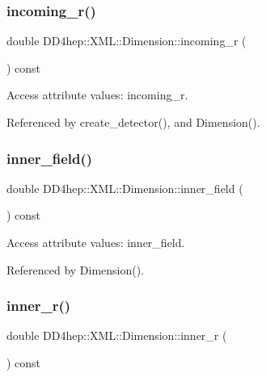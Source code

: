 \subsubsection{\texorpdfstring{incoming\+\_\+r()}{incoming\_r()}}
{\footnotesize\ttfamily double D\+D4hep\+::\+X\+M\+L\+::\+Dimension\+::incoming\+\_\+r (\begin{DoxyParamCaption}{ }\end{DoxyParamCaption}) const}



Access attribute values\+: incoming\+\_\+r. 



Referenced by create\+\_\+detector(), and Dimension().

\hypertarget{struct_d_d4hep_1_1_x_m_l_1_1_dimension_afbdb9d66db8ae29aa56ed2493fe51332}{}\label{struct_d_d4hep_1_1_x_m_l_1_1_dimension_afbdb9d66db8ae29aa56ed2493fe51332} 
\subsubsection{\texorpdfstring{inner\+\_\+field()}{inner\_field()}}
{\footnotesize\ttfamily double D\+D4hep\+::\+X\+M\+L\+::\+Dimension\+::inner\+\_\+field (\begin{DoxyParamCaption}{ }\end{DoxyParamCaption}) const}



Access attribute values\+: inner\+\_\+field. 



Referenced by Dimension().

\hypertarget{struct_d_d4hep_1_1_x_m_l_1_1_dimension_a37548157359371f57e2d6182c65ec31c}{}\label{struct_d_d4hep_1_1_x_m_l_1_1_dimension_a37548157359371f57e2d6182c65ec31c} 
\subsubsection{\texorpdfstring{inner\+\_\+r()}{inner\_r()}}
{\footnotesize\ttfamily double D\+D4hep\+::\+X\+M\+L\+::\+Dimension\+::inner\+\_\+r (\begin{DoxyParamCaption}{ }\end{DoxyParamCaption}) const}




